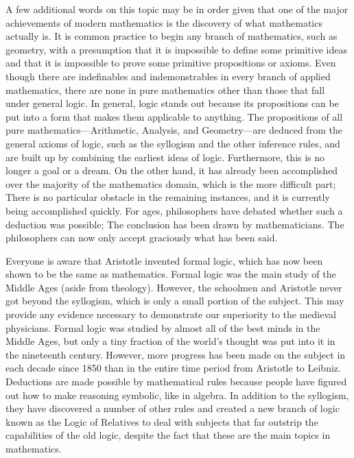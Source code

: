 \documentclass[a4paper,12pt]{book}[2004/02/16]
\theoremstyle{ilemma}
\theoremstyle{itheorem}
\theoremstyle{iother}
\theoremstyle{icorollary}
\theoremstyle{numcorollary}
\theoremstyle{idefinition}
\begin{document}
A few additional words on this topic may be in order given that one of the major achievements of modern mathematics is the discovery of what mathematics actually is. It is common practice to begin any branch of mathematics, such as geometry, with a presumption that it is impossible to define some primitive ideas and that it is impossible to prove some primitive propositions or axioms. Even though there are indefinables and indemonstrables in every branch of applied mathematics, there are none in pure mathematics other than those that fall under general logic. In general, logic stands out because its propositions can be put into a form that makes them applicable to anything. The propositions of all pure mathematics—Arithmetic, Analysis, and Geometry—are deduced from the general axioms of logic, such as the syllogism and the other inference rules, and are built up by combining the earliest ideas of logic. Furthermore, this is no longer a goal or a dream. On the other hand, it has already been accomplished over the majority of the mathematics domain, which is the more difficult part; There is no particular obstacle in the remaining instances, and it is currently being accomplished quickly. For ages, philosophers have debated whether such a deduction was possible; The conclusion has been drawn by mathematicians. The philosophers can now only accept graciously what has been said.

Everyone is aware that Aristotle invented formal logic, which has now been shown to be the same as mathematics. Formal logic was the main study of the Middle Ages (aside from theology). However, the schoolmen and Aristotle never got beyond the syllogism, which is only a small portion of the subject. This may provide any evidence necessary to demonstrate our superiority to the medieval physicians. Formal logic was studied by almost all of the best minds in the Middle Ages, but only a tiny fraction of the world's thought was put into it in the nineteenth century.
However, more progress has been made on the subject in each decade since 1850 than in the entire time period from Aristotle to Leibniz. Deductions are made possible by mathematical rules because people have figured out how to make reasoning symbolic, like in algebra. In addition to the syllogism, they have discovered a number of other rules and created a new branch of logic known as the Logic of Relatives to deal with subjects that far outstrip the capabilities of the old logic, despite the fact that these are the main topics in mathematics.
\end{document}
